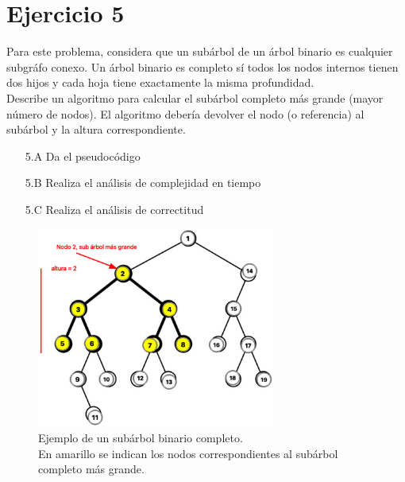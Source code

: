 \documentclass[12pt]{article}
\begin{document}
\section*{Ejercicio 5}
Para este problema, considera que un subárbol de un árbol binario es cualquier subgráfo conexo. Un árbol binario es completo sí todos los nodos internos tienen dos hijos y cada hoja tiene exactamente la misma profundidad.\\
Describe un algoritmo para calcular el subárbol completo más grande (mayor número de nodos). El algoritmo debería devolver el nodo (o referencia) al subárbol y la altura correspondiente.
\begin{itemize}
    \item[5.A] Da el pseudocódigo
    \item[5.B] Realiza el análisis de complejidad en tiempo
    \item[5.C] Realiza el análisis de correctitud
\end{itemize}
\begin{figure}
    \centering
    \includegraphics[width=0.7\textwidth]{subárbol.png}
    \caption{Ejemplo de un subárbol binario completo.\\
    En amarillo se indican los nodos correspondientes al subárbol completo más grande.}
\end{figure}
\end{document}
